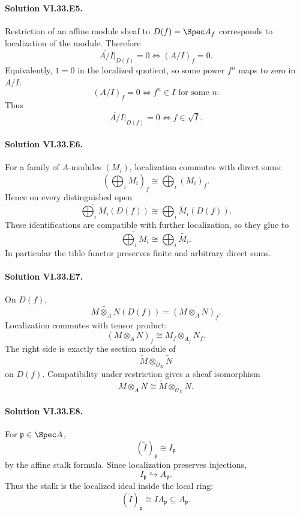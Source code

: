 \paragraph{Solution VI.33.E5.}
Restriction of an affine module sheaf to \(D(f)=\Spec A_f\) corresponds to localization of the module. Therefore
\[
\widetilde{A/I}|_{D(f)}=0
\iff
(A/I)_f=0.
\]
Equivalently, \(1=0\) in the localized quotient, so some power \(f^n\) maps to zero in \(A/I\):
\[
(A/I)_f=0
\iff
f^n\in I\text{ for some }n.
\]
Thus
\[
\boxed{\widetilde{A/I}|_{D(f)}=0\iff f\in\sqrt I}.
\]

\paragraph{Solution VI.33.E6.}
For a family of \(A\)-modules \((M_i)\), localization commutes with direct sums:
\[
\left(\bigoplus_iM_i\right)_f
\cong
\bigoplus_i(M_i)_f.
\]
Hence on every distinguished open
\[
\widetilde{\bigoplus_iM_i}(D(f))
\cong
\bigoplus_i\widetilde{M_i}(D(f)).
\]
These identifications are compatible with further localization, so they glue to
\[
\boxed{\widetilde{\bigoplus_iM_i}\cong\bigoplus_i\widetilde{M_i}}.
\]
In particular the tilde functor preserves finite and arbitrary direct sums.

\paragraph{Solution VI.33.E7.}
On \(D(f)\),
\[
\widetilde{M\otimes_A N}(D(f))
=
(M\otimes_A N)_f.
\]
Localization commutes with tensor product:
\[
(M\otimes_A N)_f
\cong
M_f\otimes_{A_f}N_f.
\]
The right side is exactly the section module of
\[
\widetilde M\otimes_{\mathcal O_X}\widetilde N
\]
on \(D(f)\).  Compatibility under restriction gives a sheaf isomorphism
\[
\boxed{
\widetilde{M\otimes_A N}
\cong
\widetilde M\otimes_{\mathcal O_X}\widetilde N.
}
\]

\paragraph{Solution VI.33.E8.}
For \(\mathfrak p\in\Spec A\),
\[
(\widetilde I)_{\mathfrak p}\cong I_{\mathfrak p}
\]
by the affine stalk formula.  Since localization preserves injections,
\[
I_{\mathfrak p}\hookrightarrow A_{\mathfrak p}.
\]
Thus the stalk is the localized ideal inside the local ring:
\[
\boxed{(\widetilde I)_{\mathfrak p}\cong I A_{\mathfrak p}\subseteq A_{\mathfrak p}}.
\]

